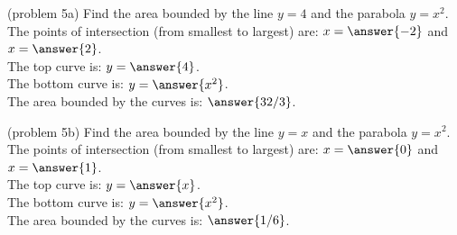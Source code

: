\documentclass[handout]{ximera}
\begin{document}
\begin{problem}(problem 5a)  Find the area bounded by the line $y = 4$ and the parabola $y = x^2$.\\

The points of intersection (from smallest to largest) are: $x = \answer{-2}$ \; and \; $x = \answer{2}$.\\
The top curve is: $y = \answer{4}$.\\
The bottom curve is: $y = \answer{x^2}$.\\
The area bounded by the curves is: $\answer{32/3}$.
\end{problem}



\begin{problem}(problem 5b)  Find the area bounded by the line $y = x$ and the parabola $y = x^2$.\\

The points of intersection (from smallest to largest) are: $x = \answer{0}$ \; and \; $x = \answer{1}$.\\
The top curve is: $y = \answer{x}$.\\
The bottom curve is: $y = \answer{x^2}$.\\
The area bounded by the curves is: $\answer{1/6}$.
\end{problem}
\end{document}

